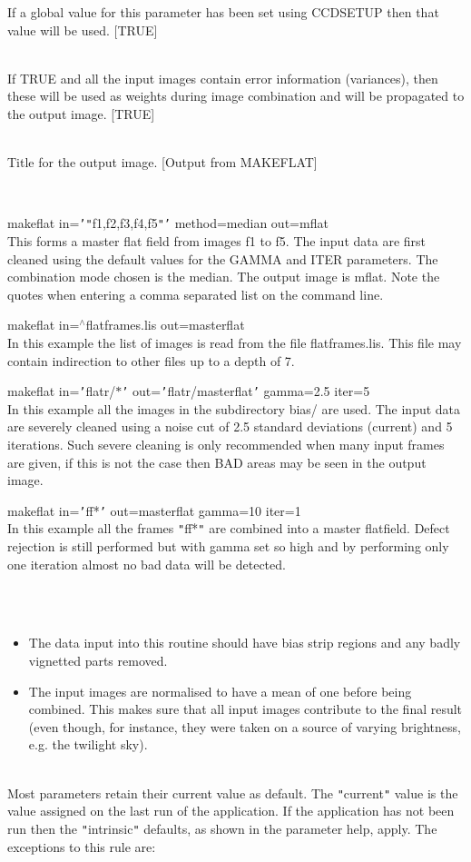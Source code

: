 \documentclass[twoside,11pt]{article}
\newcommand{\htmlref}[2]{#1}
\renewcommand{\_}{\texttt{\symbol{95}}}
\newcommand{\qt}[1]{{\tt "}#1{\tt "}}
\newcommand{\qs}[1]{{\tt '}#1{\tt '}}
\newcommand{\xroutine}[1]{\htmlref{{\sc #1}}{#1}}
\newcommand{\sstexamples}[1]{
   \item[Examples:] \mbox{} \\
   \vspace{-3.5ex}
   \begin{description}
      #1
   \end{description}
}
\newcommand{\sstsubsection}[1]{ \item[{#1}] \mbox{} \\}
\newcommand{\sstexamplesubsection}[2]{\sloppy \item{\ssttt #1} \mbox{} \\ #2 }
\newcommand{\sstnotes}[1]{\item[Notes:] \mbox{} \\[1.3ex] #1}
\newcommand{\sstdiytopic}[2]{\item[#1:] \mbox{} \\[1.3ex] #2}
\newcommand{\sstitemlist}[1]{
  \mbox{} \\
  \vspace{-3.5ex}
  \begin{itemize}
     #1
  \end{itemize}
}
\newcommand{\sstitem}{\item}
\newcommand{\sstexamples}[1]{
      \item[Examples:] \\
      \begin{description}
         #1
      \end{description}
      \\
   }
\newcommand{\sstsubsection}[1]{\item[{#1}]}
\newcommand{\sstexamplesubsection}[2]{\item[{\ssttt #1}] #2}
\newcommand{\sstnotes}[1]{\item[Notes:] #1 }
\newcommand{\sstdiytopic}[2]{\item[{#1}] #2 }
\newcommand{\sstitemlist}[1]{
      \begin{itemize}
         #1
      \end{itemize}
      \\
   }
\newcommand{\sstitem}{\item}
\begin{document}
{{{         If a global value for this parameter has been set using 
         \xroutine{CCDSETUP} then that value will be used. 
         [TRUE]
      }
      \sstsubsection{
         USEVAR = \_LOGICAL (Read)
      } {
         If TRUE and all the input images contain error information
         (variances), then these will be used as weights during image
         combination and will be propagated to the output image.
         [TRUE]
      }
      \sstsubsection{
         TITLE = LITERAL (Read)
      } {
         Title for the output image.
         [Output from MAKEFLAT]
      }
   }
   \sstexamples{
      \sstexamplesubsection{
         makeflat in=\qs{\qt{f1,f2,f3,f4,f5}} method=median out=mflat
      } {
         This forms a master flat field from images f1 to f5. The input
         data are first cleaned using the default values for the GAMMA
         and ITER parameters. The combination mode chosen is the
         median.  The output image is mflat. Note the quotes when
         entering a comma separated list on the command line.
      }
      \sstexamplesubsection{
         makeflat in=$^\wedge$flat\_frames.lis out=master\_flat
      } {
         In this example the list of images is read from the file
         flat\_frames.lis. This file may contain indirection to other files
         up to a depth of 7.
      }
      \sstexamplesubsection{
         makeflat in=\qs{flatr/$*$} out=\qs{flatr/master\_flat}
         gamma=2.5 iter=5
      } {
         In this example all the images in the subdirectory bias/ are
         used. The input data are severely cleaned using a noise cut
         of 2.5 standard deviations (current) and 5 iterations. Such
         severe cleaning is only recommended when many input frames
         are given, if this is not the case then BAD areas may be seen
         in the output image.
      }
      \sstexamplesubsection{
        makeflat in=\qs{ff*} out=master\_flat gamma=10 iter=1
      } {
        In this example all the frames \qt{ff*} are combined into a master
        flatfield. Defect rejection is still performed but with
        gamma set so high and by performing only one iteration
        almost no bad data will be detected.
      }



   }
   \sstnotes{
      \sstitemlist{

         \sstitem
         The data input into this routine should have bias strip
         regions and any badly vignetted parts removed.

         \sstitem 
         The input images are normalised to have a mean of one
         before being combined. This makes sure that all input images
         contribute to the final result (even though, for instance,
         they were taken on a source of varying brightness, e.g. the 
         twilight sky).
      }
   }
   \sstdiytopic{
      Behaviour of parameters
   } {
      Most parameters retain their current value as default. The
      \qt{current} value is the value assigned on the last run of the
      application. If the application has not been run then the
      \qt{intrinsic} defaults, as shown in the parameter help, apply.
      The exceptions to this rule are:
      \sstitemlist{

}}}
\end{document}
